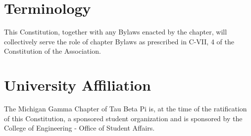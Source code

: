 \section{Terminology} This Constitution, together with any Bylaws enacted by the chapter, will collectively serve the role of chapter Bylaws as prescribed in C-VII, 4 of the Constitution of the Association.

\section{University Affiliation} The Michigan Gamma Chapter of Tau Beta Pi is, at the time of the ratification of this Constitution, a sponsored student organization and is sponsored by the College of Engineering - Office of Student Affairs. %

